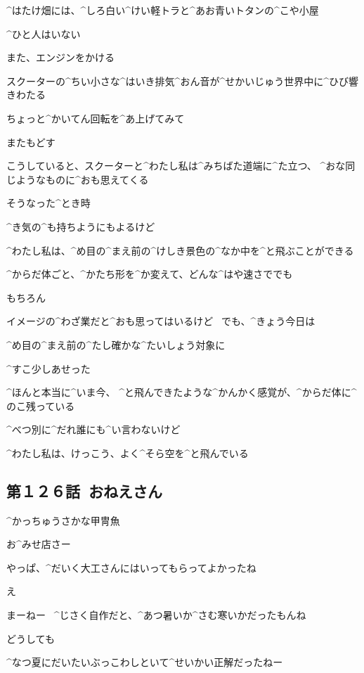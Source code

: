 \A ^{はたけ}{畑}には、^{しろ}{白}い^{けい}{軽}トラと^{あお}{青}いトタンの^{こや}{小屋}

\A ^{ひと}{人}はいない

\page[73]
\A また、エンジンをかける

\A スクーターの^{ちい}{小}さな^{はいき}{排気}^{おん}{音}が^{せかいじゅう}{世界中}に^{ひび}{響}きわたる

\page
\A ちょっと^{かいてん}{回転}を^{あ}{上}げてみて

\A またもどす

\page
\A こうしていると、スクーターと^{わたし}{私}は^{みちばた}{道端}に^{た}{立}つ、
^{おな}{同}じようなものに^{おも}{思}えてくる

\A そうなった^{とき}{時}

\A ^{き}{気}の^{も}{持}ちようにもよるけど

\page
\A ^{わたし}{私}は、^{め}{目}の^{まえ}{前}の^{けしき}{景色}の^{なか}{中}を^{と}{飛}ぶことができる

\page
\A ^{からだ}{体}ごと、^{かたち}{形}を^{か}{変}えて、どんな^{はや}{速}さででも

\page
\A もちろん

\A イメージの^{わざ}{業}だと^{おも}{思}ってはいるけど
\ でも、^{きょう}{今日}は

\page
\A ^{め}{目}の^{まえ}{前}の^{たし}{確}かな^{たいしょう}{対象}に

\A ^{すこ}{少}しあせった

\page[81]
\A ^{ほんと}{本当}に^{いま}{今}、
^{と}{飛}んできたような^{かんかく}{感覚}が、^{からだ}{体}に^{のこ}{残}っている

\page
\A ^{べつ}{別}に^{だれ}{誰}にも^{い}{言}わないけど

\A ^{わたし}{私}は、けっこう、よく^{そら}{空}を^{と}{飛}んでいる


\subsection{第１２６話\ おねえさん}

\page[84]
\Sign ^{かっちゅうさかな}{甲冑魚}

\page
\M お^{みせ}{店}さー

\M やっぱ、^{だいく}{大工}さんにはいってもらってよかったね

\A え

\A まーねー
\ ^{じさく}{自作}だと、^{あつ}{暑}いか^{さむ}{寒}いかだったもんね

\A どうしても

\M ^{なつ}{夏}にだいたいぶっこわしといて^{せいかい}{正解}だったねー

